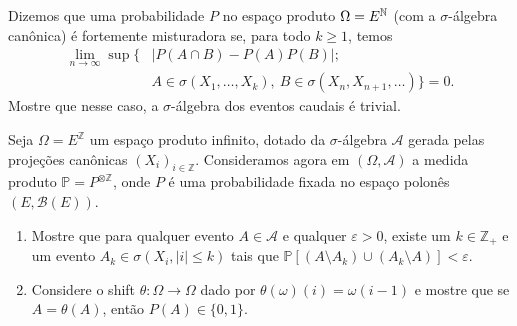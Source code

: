 \begin{exercise}
  Dizemos que uma probabilidade $P$ no espaço produto $\Omega = E^{{\mathbb N}}$ (com a $\sigma$-álgebra canônica) é fortemente misturadora se, para todo $k \geq 1$, temos
  \begin{equation}
    \begin{split}
      \lim_{n \to \infty} \sup \Big\{
      & \big| P(A \cap B) - P(A) P(B) \big|;\\
      & A \in \sigma(X_1, \dots, X_k),
        \ B \in \sigma(X_n, X_{n+1}, \dots) \Big\} = 0.
    \end{split}
  \end{equation}
  Mostre que nesse caso, a $\sigma$-álgebra dos eventos caudais é trivial.
\end{exercise}

\begin{exercise}
  Seja $\Omega = E^\mathbb{Z}$ um espaço produto infinito, dotado da $\sigma$-álgebra $\mathcal{A}$ gerada pelas projeções canônicas $(X_i)_{i \in \mathbb{Z}}$.
  Consideramos agora em $(\Omega, \mathcal{A})$ a medida produto $\mathbb{P} = P^{\otimes \mathbb{Z}}$, onde $P$ é uma probabilidade fixada no espaço polonês $(E, \mathcal{B}(E))$.
  \begin{enumerate}[\quad a)]
  \item Mostre que para qualquer evento $A \in \mathcal{A}$ e qualquer $\varepsilon > 0$, existe um $k \in \mathbb{Z}_+$ e um evento $A_k \in \sigma(X_i, |i| \leq k)$ tais que $\mathbb{P}[(A \setminus A_k) \cup (A_k \setminus A)] < \varepsilon$.
  \item Considere o shift $\theta:\Omega \to \Omega$ dado por $\theta(\omega)(i) = \omega(i-1)$ e mostre que se $A = \theta(A)$, então $P(A) \in \{0,1\}$.
  \end{enumerate}
\end{exercise}

